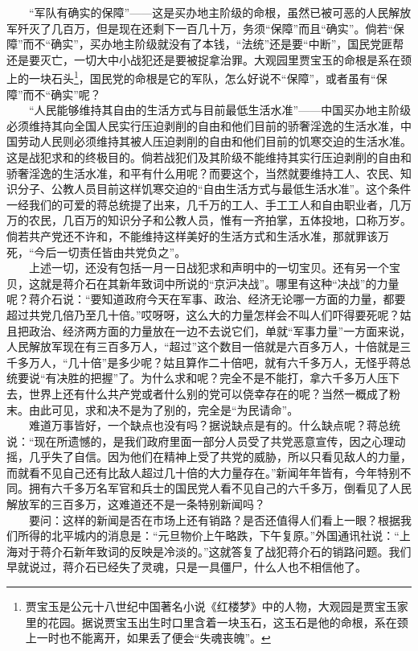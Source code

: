 \documentclass[cn,11pt,chinese]{elegantbook}
\begin{document}
　　“军队有确实的保障”——这是买办地主阶级的命根，虽然已被可恶的人民解放军歼灭了几百万，但是现在还剩下一百几十万，务须“保障”而且“确实”。倘若“保障”而不“确实”，买办地主阶级就没有了本钱，“法统”还是要“中断”，国民党匪帮还是要灭亡，一切大中小战犯还是要被捉拿治罪。大观园里贾宝玉的命根是系在颈上的一块石头\footnote[4]{ 贾宝玉是公元十八世纪中国著名小说《红楼梦》中的人物，大观园是贾宝玉家里的花园。据说贾宝玉出生时口里含着一块玉石，这玉石是他的命根，系在颈上一时也不能离开，如果丢了便会“失魂丧魄”。}，国民党的命根是它的军队，怎么好说不“保障”，或者虽有“保障”而不“确实”呢？\\
　　“人民能够维持其自由的生活方式与目前最低生活水准”——中国买办地主阶级必须维持其向全国人民实行压迫剥削的自由和他们目前的骄奢淫逸的生活水准，中国劳动人民则必须维持其被人压迫剥削的自由和他们目前的饥寒交迫的生活水准。这是战犯求和的终极目的。倘若战犯们及其阶级不能维持其实行压迫剥削的自由和骄奢淫逸的生活水准，和平有什么用呢？而要这个，当然就要维持工人、农民、知识分子、公教人员目前这样饥寒交迫的“自由生活方式与最低生活水准”。这个条件一经我们的可爱的蒋总统提了出来，几千万的工人、手工工人和自由职业者，几万万的农民，几百万的知识分子和公教人员，惟有一齐拍掌，五体投地，口称万岁。倘若共产党还不许和，不能维持这样美好的生活方式和生活水准，那就罪该万死，“今后一切责任皆由共党负之”。\\
　　上述一切，还没有包括一月一日战犯求和声明中的一切宝贝。还有另一个宝贝，这就是蒋介石在其新年致词中所说的“京沪决战”。哪里有这种“决战”的力量呢？蒋介石说：“要知道政府今天在军事、政治、经济无论哪一方面的力量，都要超过共党几倍乃至几十倍。”哎呀呀，这么大的力量怎样会不叫人们吓得要死呢？姑且把政治、经济两方面的力量放在一边不去说它们，单就“军事力量”一方面来说，人民解放军现在有三百多万人，“超过”这个数目一倍就是六百多万人，十倍就是三千多万人，“几十倍”是多少呢？姑且算作二十倍吧，就有六千多万人，无怪乎蒋总统要说“有决胜的把握”了。为什么求和呢？完全不是不能打，拿六千多万人压下去，世界上还有什么共产党或者什么别的党可以侥幸存在的呢？当然一概成了粉末。由此可见，求和决不是为了别的，完全是“为民请命”。\\
　　难道万事皆好，一个缺点也没有吗？据说缺点是有的。什么缺点呢？蒋总统说：“现在所遗憾的，是我们政府里面一部分人员受了共党恶意宣传，因之心理动摇，几乎失了自信。因为他们在精神上受了共党的威胁，所以只看见敌人的力量，而就看不见自己还有比敌人超过几十倍的大力量存在。”新闻年年皆有，今年特别不同。拥有六千多万名军官和兵士的国民党人看不见自己的六千多万，倒看见了人民解放军的三百多万，这难道还不是一条特别新闻吗？\\
　　要问：这样的新闻是否在市场上还有销路？是否还值得人们看上一眼？根据我们所得的北平城内的消息是：“元旦物价上午略跌，下午复原。”外国通讯社说：“上海对于蒋介石新年致词的反映是冷淡的。”这就答复了战犯蒋介石的销路问题。我们早就说过，蒋介石已经失了灵魂，只是一具僵尸，什么人也不相信他了。
\end{document}
